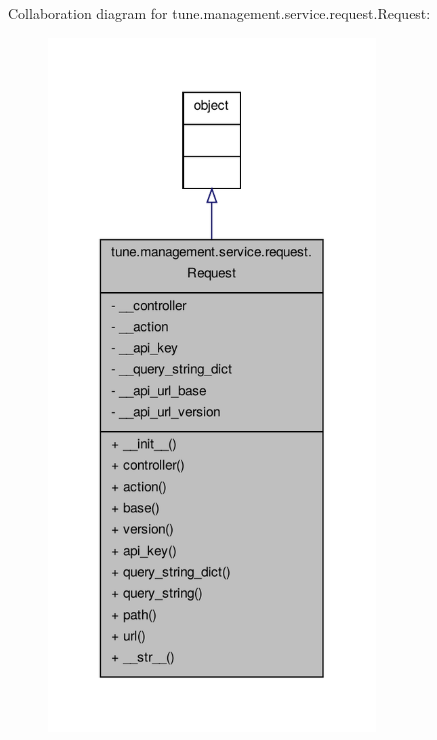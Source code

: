 Collaboration diagram for tune.\-management.\-service.\-request.\-Request\-:
\nopagebreak
\begin{figure}[H]
\begin{center}
\leavevmode
\includegraphics[width=246pt]{classtune_1_1management_1_1service_1_1request_1_1Request__coll__graph}
\end{center}
\end{figure}

